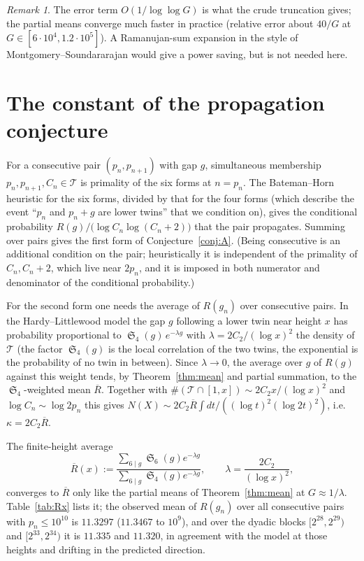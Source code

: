 \documentclass[11pt,a4paper]{article}
\theoremstyle{plain}
\theoremstyle{definition}
\theoremstyle{remark}
\newtheorem{remark}[theorem]{Remark}
\newcommand{\Tset}{\mathcal{T}}
\newcommand{\Rbar}{\overline{R}}
\DeclareMathOperator{\Sing}{\mathfrak S}
\begin{document}
\begin{remark}
The error term $O(1/\log\log G)$ is what the crude truncation gives; the
partial means converge much faster in practice (relative error about
$40/G$ at $G\in[6\cdot10^4,1.2\cdot10^5]$).  A Ramanujan-sum
expansion in the style of Montgomery--Soundararajan would give a power
saving, but is not needed here.
\end{remark}

\section{The constant of the propagation conjecture}\label{sec:conj}

For a consecutive pair $(p_n,p_{n+1})$ with gap $g$, simultaneous
membership $p_n,p_{n+1},C_n\in\Tset$ is primality of the six forms at
$n=p_n$.  The Bateman--Horn heuristic for the six forms, divided by that
for the four forms (which describe the event ``$p_n$ and $p_n+g$ are lower
twins'' that we condition on), gives the conditional probability
$R(g)/\bigl(\log C_n\log(C_n+2)\bigr)$ that the pair propagates.  Summing
over pairs gives the first form of Conjecture~\ref{conj:A}.  (Being
consecutive is an additional condition on the pair; heuristically it is
independent of the primality of $C_n,C_n+2$, which live near $2p_n$, and it
is imposed in both numerator and denominator of the conditional
probability.)

For the second form one needs the average of $R(g_n)$ over consecutive
pairs.  In the Hardy--Littlewood model the gap $g$ following a lower twin
near height $x$ has probability proportional to
$\Sing_4(g)\,e^{-\lambda g}$ with $\lambda=2C_2/(\log x)^2$ the density of
$\Tset$ (the factor $\Sing_4(g)$ is the local correlation of the two twins,
the exponential is the probability of no twin in between).  Since
$\lambda\to0$, the average over $g$ of $R(g)$ against this weight tends,
by Theorem~\ref{thm:mean} and partial summation, to the $\Sing_4$-weighted
mean $\Rbar$.  Together with $\#(\Tset\cap[1,x])\sim2C_2x/(\log x)^2$ and
$\log C_n\sim\log 2p_n$ this gives $N(X)\sim2C_2\Rbar\int dt/((\log t)^2(\log2t)^2)$,
i.e.\ $\kappa=2C_2\Rbar$.

The finite-height average
\[
\Rbar(x):=\frac{\sum_{6\mid g}\Sing_6(g)e^{-\lambda g}}{\sum_{6\mid g}\Sing_4(g)e^{-\lambda g}},
\qquad\lambda=\frac{2C_2}{(\log x)^2},
\]
converges to $\Rbar$ only like the partial means of Theorem~\ref{thm:mean}
at $G\approx1/\lambda$.  Table~\ref{tab:Rx} lists it; the observed mean of
$R(g_n)$ over all consecutive pairs with $p_n\le10^{10}$ is $11.3297$
($11.3467$ to $10^9$), and over the dyadic blocks $[2^{28},2^{29})$ and
$[2^{33},2^{34})$ it is $11.335$ and $11.320$, in agreement with the model
at those heights and drifting in the predicted direction.
\end{document}

